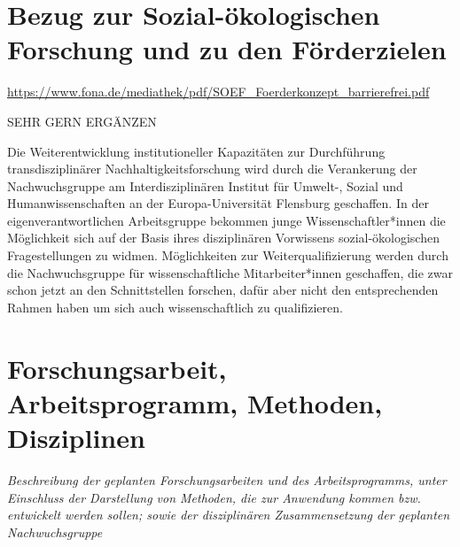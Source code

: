 \documentclass[a4paper,11pt,twoside]{scrartcl}
\begin{document}
\section{Bezug zur Sozial-ökologischen Forschung und zu den Förderzielen}

\url{https://www.fona.de/mediathek/pdf/SOEF_Foerderkonzept_barrierefrei.pdf}

SEHR GERN ERGÄNZEN


Die Weiterentwicklung institutioneller Kapazitäten zur Durchführung transdisziplinärer Nachhaltigkeitsforschung wird durch die Verankerung der Nachwuchsgruppe am Interdisziplinären Institut für Umwelt-, Sozial und Humanwissenschaften an der Europa-Universität Flensburg geschaffen. In der eigenverantwortlichen Arbeitsgruppe bekommen junge Wissenschaftler*innen die Möglichkeit sich auf der Basis ihres disziplinären Vorwissens sozial-ökologischen Fragestellungen zu widmen. Möglichkeiten zur Weiterqualifizierung werden durch die  Nachwuchsgruppe für wissenschaftliche Mitarbeiter*innen geschaffen, die zwar schon jetzt an den Schnittstellen forschen, dafür aber nicht den entsprechenden Rahmen haben um sich auch wissenschaftlich zu qualifizieren.


\section{Forschungsarbeit, Arbeitsprogramm, Methoden, Disziplinen}
\textit{Beschreibung der geplanten Forschungsarbeiten und des Arbeitsprogramms, unter Einschluss der Darstellung von Methoden, die zur Anwendung kommen bzw. entwickelt werden sollen; sowie der disziplinären Zusammensetzung der geplanten Nachwuchsgruppe}

\end{document}
